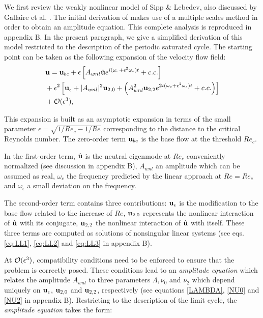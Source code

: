\documentclass[twocolumn,10pt]{asme2ej}
\newcommand{\be}[1]{ \begin{equation} \label{#1}}
\newcommand{\ee}{\end{equation}}
\begin{document}
We first review the weakly nonlinear model of Sipp \& 
Lebedev\cite{SippLebedev}, also discussed by Gallaire et al. \cite{FDR2016}.  
The initial derivation of \cite{SippLebedev} makes use of a multiple scales method in order to obtain an amplitude equation.
This complete analysis is reproduced in appendix B. In the present paragraph, we give a simplified derivation of this model restricted to the description of the periodic saturated cycle.
The starting point can be taken as the following expansion of the velocity flow field:
\be{WNL1}
\begin{aligned}
&{\bf u} = {}  {\bf u}_{bc} + \epsilon \left[ A_{wnl}  \hat{\bf u} e^{i (\omega_c+\epsilon^2 \omega_\epsilon)  t} + c.c. \right]\\
&+ \epsilon^2 \left[ {\bf u}_\epsilon + |A_{wnl}|^2  {\bf u}_{2,0} + \left(  A_{wnl}^2 {\bf u}_{2,2} e^{2 i(\omega_c+\epsilon^2 \omega_\epsilon)  t} + c.c. \right) \right]\\
& + {\cal O}( \epsilon ^3),
\end{aligned}
\ee



This expansion is built as an asymptotic expansion in terms of the small parameter $\epsilon = \sqrt{1/Re_c - 1/Re}$ corresponding to the distance to the critical Reynolds number. 
The zero-order term ${\bf u}_{bc}$ is the base flow at the threshold $Re_c$.

In the first-order term, $\hat{\bf u}$ is the neutral eigenmode at $Re_c$ conveniently normalized (see discussion in appendix B), 
$A_{wnl}$ an amplitude which can be assumed as real, $\omega_c$ the frequency predicted by the linear approach at $Re=Re_c$ and $\omega_\epsilon$ a small deviation on the frequency. 

The second-order term contains three contributions: ${\bf u}_{\epsilon}$ is the modification to the base flow related to the increase of $Re$, ${\bf u}_{2,0}$ represents the nonlinear interaction of $\hat{\bf u}$ with its conjugate, ${\bf u}_{2,2}$ the nonlinear interaction of $\hat{\bf u}$ with itself.
These three terms are computed as solutions of nonsingular linear systems (see eqs. \eqref{eq:LL1}, \eqref{eq:LL2} and \eqref{eq:LL3} in appendix B).

At ${\cal O}( \epsilon ^3)$, compatibility conditions need to be enforced to ensure that the problem is correctly posed.
These conditions lead to an {\em amplitude equation} which relates the amplitude $ A_{wnl}$ to three parameters $\Lambda, \nu_{0}$ and $\nu_{2}$ which depend
uniquely on ${\bf u}_\epsilon$, ${\bf u}_{2,0}$ and ${\bf u}_{2,2}$, respectively (see equations \eqref{LAMBDA}, \eqref{NU0} and \eqref{NU2} in appendix B). Restricting to the description of the limit cycle, the {\em amplitude equation} takes the form:
\end{document}
